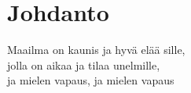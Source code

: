 
\section{Johdanto}
Maailma on kaunis ja hyvä elää sille,\\
jolla on aikaa ja tilaa unelmille,\\
ja mielen vapaus, ja mielen vapaus



%
